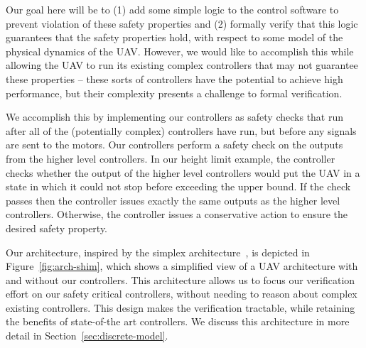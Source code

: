 Our goal here will be to (1) add some simple logic to the control software
to prevent violation of these safety properties and (2) formally verify
that this logic guarantees that the safety properties hold, with respect to
some model of the physical dynamics of the UAV.  However, we would like to
accomplish this while allowing the UAV to run its existing complex
controllers that may not guarantee these properties -- these sorts of
controllers have the potential to achieve high performance, but their
complexity presents a challenge to formal verification.

We accomplish this by implementing our controllers as safety checks that
run after all of the (potentially complex) controllers have run, but before
any signals are sent to the motors.  Our controllers perform a safety check
on the outputs from the higher level controllers.  In our height limit
example, the controller checks whether the output of the higher level
controllers would put the UAV in a state in which it could not stop before
exceeding the upper bound.  If the check passes then the controller issues
exactly the same outputs as the higher level controllers.  Otherwise, the
controller issues a conservative action to ensure the desired safety
property.

Our architecture, inspired by the simplex
architecture~\cite{sha1996evolving}, is depicted in
Figure~\ref{fig:arch-shim}, which shows a simplified view of a UAV
architecture with and without our controllers.  This architecture allows us
to focus our verification effort on our safety critical controllers,
without needing to reason about complex existing controllers.  This design
makes the verification tractable, while retaining the benefits of
state-of-the art controllers. We discuss this architecture in more detail
in Section~\ref{sec:discrete-model}.

